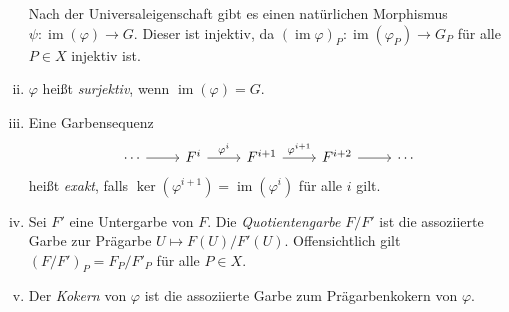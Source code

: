 \begin{enumerate}[(i)]
Nach der Universaleigenschaft gibt es einen natürlichen Morphismus $\psi:\operatorname{im}(\varphi)\to G$. Dieser ist injektiv, da $(\operatorname{im}\varphi)_P:\operatorname{im}(\varphi_P) \to G_P$ für alle $P\in X$ injektiv ist.
\item $\varphi$ heißt \textit{surjektiv}, wenn $\operatorname{im}(\varphi)=G$.
\item Eine Garbensequenz
\[\begin{tikzcd}
\cdots \ar[r] & F^i\ar[r, "\varphi^i"] & F^{i+1}\ar[r, "\varphi^{i+1}"] & F^{i+2}\ar[r] & \cdots
\end{tikzcd} \]
heißt \textit{exakt}, falls $\ker(\varphi^{i+1})=\operatorname{im}(\varphi^i)$ für alle $i$ gilt.
\item Sei $F'$ eine Untergarbe von $F$. Die \textit{Quotientengarbe} $F/F'$ ist die assoziierte Garbe zur Prägarbe $U\mapsto F(U)/F'(U)$. Offensichtlich gilt $(F/F')_P=F_P/F'_P$ für alle $P\in X$.
\item Der \textit{Kokern} von $\varphi$ ist die assoziierte Garbe zum Prägarbenkokern von $\varphi$.
\end{enumerate}

